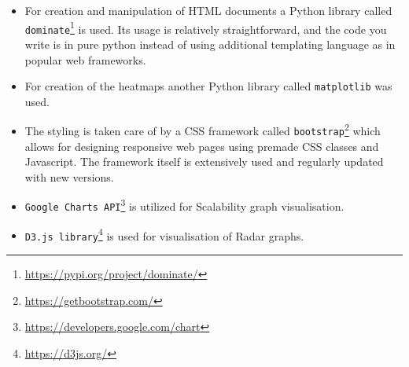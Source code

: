 \begin{itemize}
    \item For creation and manipulation of HTML documents a Python library called \texttt{dominate}\footnote{\url{https://pypi.org/project/dominate/}} is used. Its usage is relatively straightforward, and the code you write is in pure python instead of using additional templating language as in popular web frameworks.
    \item For creation of the heatmaps another Python library called \texttt{matplotlib} was used.
    \item The styling is taken care of by a CSS framework called \texttt{bootstrap}\footnote{\url{https://getbootstrap.com/}} which allows for designing responsive web pages using premade CSS classes and Javascript. The framework itself is extensively used and regularly updated with new versions.
    \item \texttt{Google Charts API}\footnote{\url{https://developers.google.com/chart}}  is utilized for Scalability graph visualisation.
    \item \texttt{D3.js library}\footnote{\url{https://d3js.org/}}  is used for visualisation of Radar graphs.
\end{itemize}

